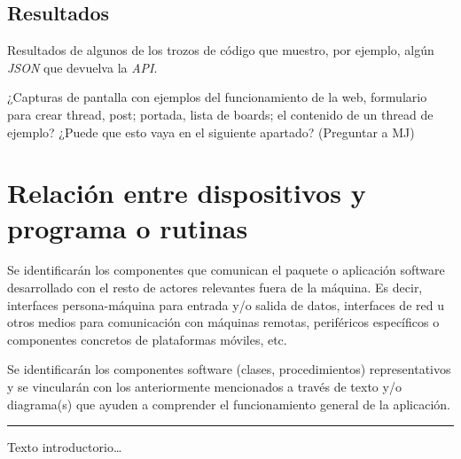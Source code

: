 \documentclass[12pt,a4paper,titlepage]{article}
\begin{document}
    \subsection{Resultados}

    Resultados de algunos de los trozos de código que muestro, por ejemplo, algún \textit{JSON} que devuelva la \textit{API}.

    ¿Capturas de pantalla con ejemplos del funcionamiento de la web, formulario para crear thread, post; portada, lista de boards; el contenido de un thread de ejemplo? ¿Puede que esto vaya en el siguiente apartado? (Preguntar a MJ)

    \section{Relación entre dispositivos y programa o rutinas}

    Se identificarán los componentes que comunican el paquete o aplicación software desarrollado con el resto de actores relevantes fuera de la máquina. Es decir, interfaces persona-máquina para entrada y/o salida de datos, interfaces de red u otros medios para comunicación con máquinas remotas, periféricos específicos o componentes concretos de plataformas móviles, etc.

    Se identificarán los componentes software (clases, procedimientos) representativos y se vincularán con los anteriormente mencionados a través de texto y/o diagrama(s) que ayuden a comprender el funcionamiento general de la aplicación.

    \bigskip\hrule\bigskip

    Texto introductorio\dots

    

    \newpage

    \printbibliography
    \newpage

    \lstlistoflistings
\end{document}
